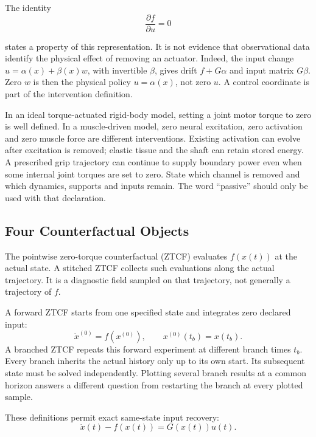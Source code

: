 The identity
\begin{equation}
\frac{\partial f}{\partial u}=0
\label{eq:ch7:drift-invariance}
\end{equation}

states a property of this representation. It is not evidence that observational data identify the physical effect of removing an actuator. Indeed, the input change $u=\alpha(x)+\beta(x)w$, with invertible $\beta$, gives drift $f+G\alpha$ and input matrix $G\beta$. Zero $w$ is then the physical policy $u=\alpha(x)$, not zero $u$. A control coordinate is part of the intervention definition.

In an ideal torque-actuated rigid-body model, setting a joint motor torque to zero is well defined. In a muscle-driven model, zero neural excitation, zero activation and zero muscle force are different interventions. Existing activation can evolve after excitation is removed; elastic tissue and the shaft can retain stored energy. A prescribed grip trajectory can continue to supply boundary power even when some internal joint torques are set to zero. State which channel is removed and which dynamics, supports and inputs remain. The word ``passive'' should only be used with that declaration.

\subsection{Four Counterfactual Objects}
\label{def:ch7:ZTCF}
The pointwise zero-torque counterfactual (ZTCF) evaluates $f(x(t))$ at the actual state. A stitched ZTCF collects such evaluations along the actual trajectory. It is a diagnostic field sampled on that trajectory, not generally a trajectory of $f$.

A forward ZTCF starts from one specified state and integrates zero declared input:
\begin{equation}
\dot x^{(0)}=f(x^{(0)}),\qquad x^{(0)}(t_b)=x(t_b).
\label{eq:ch7:ZTCF}
\end{equation}
\label{eq:ch7:ivp}
A branched ZTCF repeats this forward experiment at different branch times $t_b$. Every branch inherits the actual history only up to its own start. Its subsequent state must be solved independently. Plotting several branch results at a common horizon answers a different question from restarting the branch at every plotted sample.

These definitions permit exact same-state input recovery:
\begin{equation}
\dot x(t)-f(x(t))=G(x(t))u(t).
\label{eq:ch7:input-recovery}
\end{equation}

